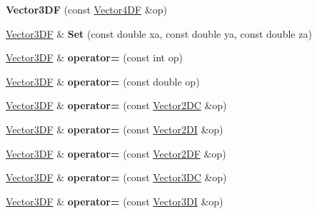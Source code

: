 \begin{DoxyCompactItemize}
\item 
\hypertarget{class_vector3_d_f_a0ba5ae0945b0d24cd73dfda09bc8f61a}{{\bfseries Vector3\+D\+F} (const \hyperlink{class_vector4_d_f}{Vector4\+D\+F} \&op)}\label{class_vector3_d_f_a0ba5ae0945b0d24cd73dfda09bc8f61a}

\item 
\hypertarget{class_vector3_d_f_aebdc84728429e9035af9df38f10d6932}{\hyperlink{class_vector3_d_f}{Vector3\+D\+F} \& {\bfseries Set} (const double xa, const double ya, const double za)}\label{class_vector3_d_f_aebdc84728429e9035af9df38f10d6932}

\item 
\hypertarget{class_vector3_d_f_a52f7919e9b16c8c73653ee6cff7c24da}{\hyperlink{class_vector3_d_f}{Vector3\+D\+F} \& {\bfseries operator=} (const int op)}\label{class_vector3_d_f_a52f7919e9b16c8c73653ee6cff7c24da}

\item 
\hypertarget{class_vector3_d_f_a42dbffd4114d2fde49075cf775206914}{\hyperlink{class_vector3_d_f}{Vector3\+D\+F} \& {\bfseries operator=} (const double op)}\label{class_vector3_d_f_a42dbffd4114d2fde49075cf775206914}

\item 
\hypertarget{class_vector3_d_f_ab67c218ea3fed2573b0eb735b9fa7fd2}{\hyperlink{class_vector3_d_f}{Vector3\+D\+F} \& {\bfseries operator=} (const \hyperlink{class_vector2_d_c}{Vector2\+D\+C} \&op)}\label{class_vector3_d_f_ab67c218ea3fed2573b0eb735b9fa7fd2}

\item 
\hypertarget{class_vector3_d_f_a9aebc0221385b956d8717a06172b1c44}{\hyperlink{class_vector3_d_f}{Vector3\+D\+F} \& {\bfseries operator=} (const \hyperlink{class_vector2_d_i}{Vector2\+D\+I} \&op)}\label{class_vector3_d_f_a9aebc0221385b956d8717a06172b1c44}

\item 
\hypertarget{class_vector3_d_f_a359748153f1a347d1817e1bc26aecf15}{\hyperlink{class_vector3_d_f}{Vector3\+D\+F} \& {\bfseries operator=} (const \hyperlink{class_vector2_d_f}{Vector2\+D\+F} \&op)}\label{class_vector3_d_f_a359748153f1a347d1817e1bc26aecf15}

\item 
\hypertarget{class_vector3_d_f_aa372811f0c6d545d374997b4737fc5de}{\hyperlink{class_vector3_d_f}{Vector3\+D\+F} \& {\bfseries operator=} (const \hyperlink{class_vector3_d_c}{Vector3\+D\+C} \&op)}\label{class_vector3_d_f_aa372811f0c6d545d374997b4737fc5de}

\item 
\hypertarget{class_vector3_d_f_a74db5bdb2ae647ccbc04f728bde9dae5}{\hyperlink{class_vector3_d_f}{Vector3\+D\+F} \& {\bfseries operator=} (const \hyperlink{class_vector3_d_i}{Vector3\+D\+I} \&op)}\label{class_vector3_d_f_a74db5bdb2ae647ccbc04f728bde9dae5}


\end{DoxyCompactItemize}
